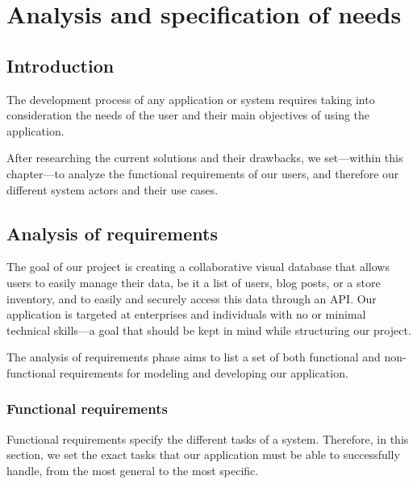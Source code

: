 \chapter{Analysis and specification of needs}
\label{chap:analysis}

\section{Introduction}

The development process of any application or system requires taking into consideration the needs of the user and their main objectives of using the application.

After researching the current solutions and their drawbacks, we set---within this chapter---to analyze the functional requirements of our users, and therefore our different system actors and their use cases.

\section{Analysis of requirements}

The goal of our project is creating a collaborative visual database that allows users to easily manage their data, be it a list of users, blog posts, or a store inventory, and to easily and securely access this data through an API.
Our application is targeted at enterprises and individuals with no or minimal technical skills---a goal that should be kept in mind while structuring our project.

The analysis of requirements phase aims to list a set of both functional and non-functional requirements for modeling and developing our application.

\subsection{Functional requirements}

Functional requirements specify the different tasks of a system.
Therefore, in this section, we set the exact tasks that our application must be able to successfully handle, from the most general to the most specific.

